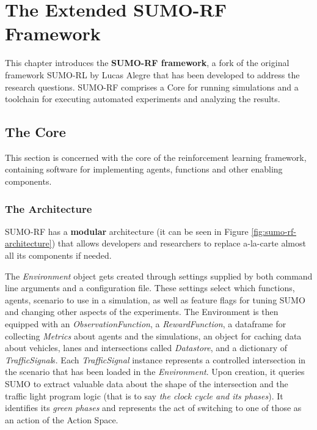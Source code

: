 \chapter{The Extended SUMO-RF Framework}
\label{chapter:sumo-rl}

This chapter introduces the \textbf{SUMO-RF framework}, a fork of the original framework SUMO-RL by Lucas Alegre that has been developed to address the research questions.
SUMO-RF comprises a Core for running simulations and a toolchain for executing automated experiments and analyzing the results.

\section{The Core}

This section is concerned with the core of the reinforcement learning framework, containing software for implementing agents, functions and other enabling components.

\subsection{The Architecture}

SUMO-RF has a \textbf{modular} architecture (it can be seen in Figure \ref{fig:sumo-rf-architecture}) that allows developers and researchers to replace a-la-carte almost all its components if needed.

The \textit{Environment} object gets created through settings supplied by both command line arguments and a configuration file.
These settings select which functions, agents, scenario to use in a simulation, as well as feature flags for tuning SUMO and changing other aspects of the experiments.
The Environment is then equipped with an \textit{ObservationFunction}, a \textit{RewardFunction}, a dataframe for collecting \textit{Metrics} about agents and the simulations, an object for caching data about vehicles, lanes and intersections called \textit{Datastore}, and a dictionary of \textit{TrafficSignal}s.
Each \textit{TrafficSignal} instance represents a controlled intersection in the scenario that has been loaded in the \textit{Environment}. Upon creation, it queries SUMO to extract valuable data about the shape of the intersection and the traffic light program logic (that is to say \textit{the clock cycle and its phases}). It identifies its \textit{green phases} and represents the act of switching to one of those as an action of the Action Space.

